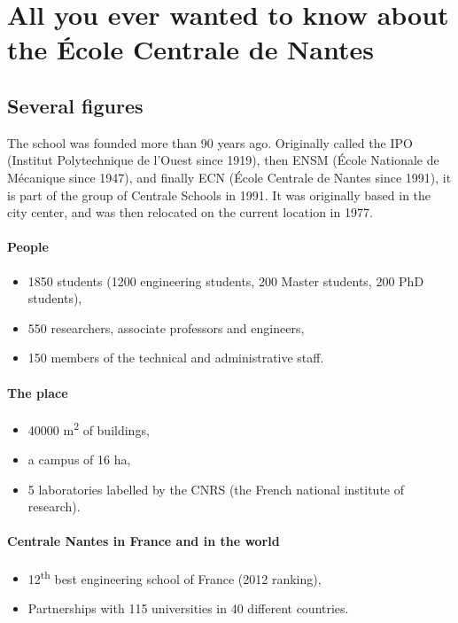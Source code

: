 
\section{All you ever wanted to know about the École Centrale de Nantes}
\subsection{Several figures}
The school was founded more than 90 years ago.
Originally called the IPO (Institut Polytechnique de l'Ouest since 1919), then ENSM (École Nationale de Mécanique since 1947), and finally ECN (École Centrale de Nantes since 1991), it is part of the group of Centrale Schools in 1991.
It was originally based in the city center, and was then relocated on the current location in 1977.

\paragraph{People}
\begin{itemize}
  \item 1850 students (1200 engineering students, 200 Master students, 200 PhD students),
  \item 550 researchers, associate professors and engineers,
  \item 150 members of the technical and administrative staff.
\end{itemize}
\paragraph{The place}
\begin{itemize}
  \item 40000 m\textsuperscript{2} of buildings,
  \item a campus of 16 ha,
  \item 5 laboratories labelled by the CNRS (the French national institute of research).
\end{itemize}
\paragraph{Centrale Nantes in France and in the world}
\begin{itemize}
  \item 12\textsuperscript{th} best engineering school of France (2012 ranking),
  \item Partnerships with 115 universities in 40 different countries.
\end{itemize}

